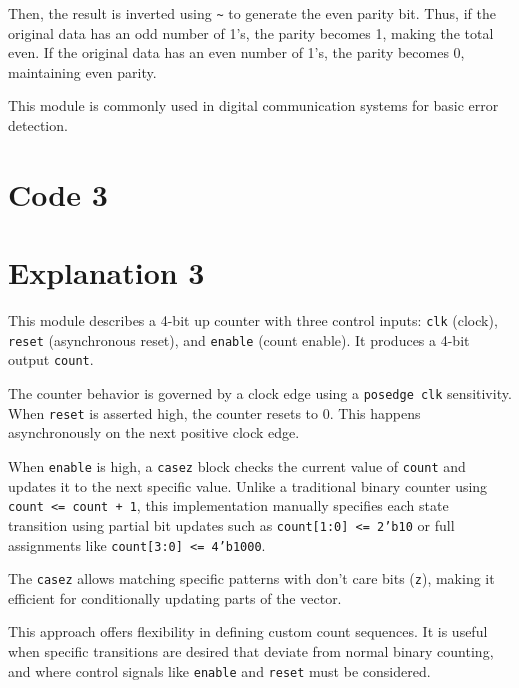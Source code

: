 \documentclass{article}
\begin{document}
Then, the result is inverted using \texttt{\~{}} to generate the even parity bit. Thus, if the original data has an odd number of 1's, the parity becomes 1, making the total even. If the original data has an even number of 1's, the parity becomes 0, maintaining even parity.

This module is commonly used in digital communication systems for basic error detection.

\section*{Code 3}


\section*{Explanation 3}
This module describes a 4-bit up counter with three control inputs: \texttt{clk} (clock), \texttt{reset} (asynchronous reset), and \texttt{enable} (count enable). It produces a 4-bit output \texttt{count}.

The counter behavior is governed by a clock edge using a \texttt{posedge clk} sensitivity. When \texttt{reset} is asserted high, the counter resets to 0. This happens asynchronously on the next positive clock edge.

When \texttt{enable} is high, a \texttt{casez} block checks the current value of \texttt{count} and updates it to the next specific value. Unlike a traditional binary counter using \texttt{count <= count + 1}, this implementation manually specifies each state transition using partial bit updates such as \texttt{count[1:0] <= 2'b10} or full assignments like \texttt{count[3:0] <= 4'b1000}.

The \texttt{casez} allows matching specific patterns with don’t care bits (\texttt{z}), making it efficient for conditionally updating parts of the vector.

This approach offers flexibility in defining custom count sequences. It is useful when specific transitions are desired that deviate from normal binary counting, and where control signals like \texttt{enable} and \texttt{reset} must be considered.
\end{document}
